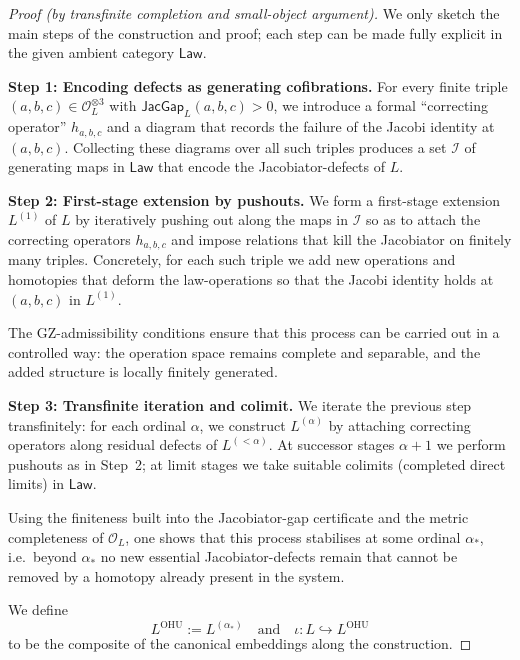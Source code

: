 \documentclass[11pt]{book}
\theoremstyle{plain}
\theoremstyle{definition}
\begin{document}
\begin{proof}[Proof (by transfinite completion and small-object argument)]
We only sketch the main steps of the construction and proof; each step
can be made fully explicit in the given ambient category
\(\mathsf{Law}\).

\medskip\noindent
\textbf{Step 1: Encoding defects as generating cofibrations.}
For every finite triple \((a,b,c)\in\mathcal{O}_L^{\otimes 3}\) with
\(\mathsf{JacGap}_L(a,b,c)>0\), we introduce a formal ``correcting
operator'' \(h_{a,b,c}\) and a diagram that records the failure of the
Jacobi identity at \((a,b,c)\).  Collecting these diagrams over all
such triples produces a set \(\mathcal{I}\) of generating maps in
\(\mathsf{Law}\) that encode the Jacobiator-defects of \(L\).



\medskip\noindent
\textbf{Step 2: First-stage extension by pushouts.}
We form a first-stage extension \(L^{(1)}\) of \(L\) by iteratively
pushing out along the maps in \(\mathcal{I}\) so as to attach the
correcting operators \(h_{a,b,c}\) and impose relations that kill the
Jacobiator on finitely many triples.  Concretely, for each such triple
we add new operations and homotopies that deform the law-operations so
that the Jacobi identity holds at \((a,b,c)\) in \(L^{(1)}\).

The GZ-admissibility conditions ensure that this process can be carried
out in a controlled way: the operation space remains complete and
separable, and the added structure is locally finitely generated.



\medskip\noindent
\textbf{Step 3: Transfinite iteration and colimit.}
We iterate the previous step transfinitely: for each ordinal
\(\alpha\), we construct \(L^{(\alpha)}\) by attaching correcting
operators along residual defects of \(L^{(<\alpha)}\).  At successor
stages \(\alpha+1\) we perform pushouts as in Step~2; at limit stages
we take suitable colimits (completed direct limits) in
\(\mathsf{Law}\).

Using the finiteness built into the Jacobiator-gap certificate and the
metric completeness of \(\mathcal{O}_L\), one shows that this process
stabilises at some ordinal \(\alpha_*\), i.e.\ beyond \(\alpha_*\) no
new essential Jacobiator-defects remain that cannot be removed by a
homotopy already present in the system.

We define
\[
  L^{\mathrm{OHU}} := L^{(\alpha_*)}
  \quad\text{and}\quad
  \iota : L\hookrightarrow L^{\mathrm{OHU}}
\]
to be the composite of the canonical embeddings along the construction.




\end{proof}
\end{document}
